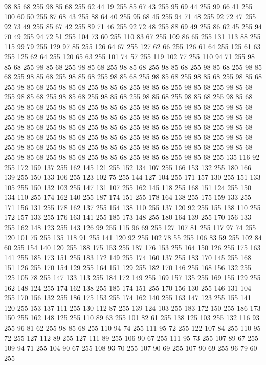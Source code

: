 98 85 68 255 98 85 68 255 62 44 19 255 85 67 43 255 95 69 44 255 99 66 41 255 100 60 50 255 87 68 43 255 88 64 40 255 95 68 45 255 94 71 48 255 92 72 47 255 92 73 49 255 85 67 42 255 89 71 46 255 92 72 48 255 88 69 49 255 86 62 45 255 94 70 49 255 94 72 51 255 104 73 60 255 110 83 67 255 109 86 65 255 131 113 88 255 115 99 79 255 129 97 85 255 126 64 67 255 127 62 66 255 126 61 64 255 125 61 63 255 125 62 64 255 120 65 63 255 101 74 57 255 119 102 77 255 110 94 71 255 98 85 68 255 98 85 68 255 98 85 68 255 98 85 68 255 98 85 68 255 98 85 68 255 98 85 68 255 98 85 68 255 98 85 68 255 98 85 68 255 98 85 68 255 98 85 68 255 98 85 68 255 98 85 68 255 98 85 68 255 98 85 68 255 98 85 68 255 98 85 68 255 98 85 68 255 98 85 68 255 98 85 68 255 98 85 68 255 98 85 68 255 98 85 68 255 98 85 68 255 98 85 68 255 98 85 68 255 98 85 68 255 98 85 68 255
98 85 68 255 98 85 68 255 98 85 68 255 98 85 68 255 98 85 68 255 98 85 68 255 98 85 68 255 98 85 68 255 98 85 68 255 98 85 68 255 98 85 68 255 98 85 68 255 98 85 68 255 98 85 68 255 98 85 68 255 98 85 68 255 98 85 68 255 98 85 68 255 98 85 68 255 98 85 68 255 98 85 68 255 98 85 68 255 98 85 68 255 98 85 68 255 98 85 68 255 98 85 68 255 98 85 68 255 98 85 68 255 98 85 68 255 98 85 68 255 98 85 68 255 135 116 92 255 172 159 137 255 162 145 121 255 152 134 107 255 166 153 132 255 180 166 139 255 150 133 106 255 123 102 75 255 144 127 104 255 171 157 130 255 151 133 105 255 150 132 103 255 147 131 107 255 162 145 118 255 168 151 124 255 150 134 110 255 174 162 140 255 187 174 151 255 178 164 138 255 175 159 133 255 171 156 131 255 178 162 137 255 154 138 110 255 137 120 92 255 155 138 110 255 172 157 133 255 176 163 141 255 185 173 148 255 180 164 139 255 170 156 133 255 162 148 123 255 143 126 99 255 115 96 69 255
127 107 81 255 117 97 74 255 120 101 75 255 135 118 91 255 141 120 92 255 102 78 55 255 106 83 59 255 102 84 60 255 154 140 120 255 188 175 153 255 187 176 153 255 164 150 126 255 175 163 141 255 185 173 151 255 183 172 149 255 174 160 137 255 183 170 145 255 168 151 126 255 170 154 129 255 164 151 129 255 182 170 146 255 168 156 132 255 125 105 78 255 147 133 113 255 184 172 149 255 169 157 135 255 169 155 129 255 162 148 124 255 174 162 138 255 185 174 151 255 170 156 130 255 146 131 104 255 170 156 132 255 186 175 153 255 174 162 140 255 163 147 123 255 155 141 120 255 153 137 111 255 130 112 87 255 139 124 103 255 183 172 150 255 186 173 150 255 162 148 125 255 110 89 63 255 101 82 61 255 138 125 103 255 132 116 93 255 96 81 62 255 98 85 68 255 110 94 74 255 111 95 72 255 122 107 84 255 110 95 72 255 127 112 89 255 127 111 89 255 106 90 67 255 111 95 73 255 107 89 67 255 109 94 71 255 104 90 67 255 108 93 70 255 107 90 69 255 107 90 69 255 96 79 60 255

